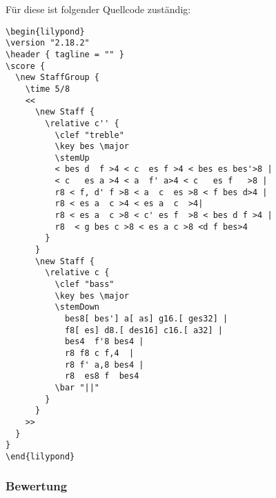 Für diese ist folgender Quellcode zuständig:

\begin{verbatim}
\begin{lilypond}
\version "2.18.2"
\header { tagline = "" }
\score {
  \new StaffGroup {
    \time 5/8
    <<
      \new Staff {
        \relative c'' {
          \clef "treble"
          \key bes \major  
          \stemUp
          < bes d  f >4 < c  es f >4 < bes es bes'>8 |
          < c   es a >4 < a  f' a>4 < c   es f   >8 |         
          r8 < f, d' f >8 < a  c  es >8 < f bes d>4 |
          r8 < es a  c >4 < es a  c  >4|
          r8 < es a  c >8 < c' es f  >8 < bes d f >4 |
          r8  < g bes c >8 < es a c >8 <d f bes>4
        }   
      }
      \new Staff {
        \relative c { 
          \clef "bass"
          \key bes \major  
          \stemDown
            bes8[ bes'] a[ as] g16.[ ges32] |
            f8[ es] d8.[ des16] c16.[ a32] | 
            bes4  f'8 bes4 |
            r8 f8 c f,4  | 
            r8 f' a,8 bes4 | 
            r8  es8 f  bes4
          \bar "||"
        }   
      }
    >>
  }
}
\end{lilypond}
\end{verbatim}

\subsubsection{Bewertung}





%
